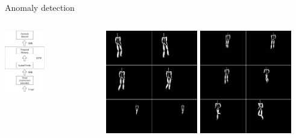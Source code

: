 \documentclass[default]{beamer}
\begin{document}
		\begin{frame}{Anomaly detection}
		\footnotesize
		
		\begin{columns}
			\begin{column}{0.5\textwidth}
				\centering
				\includegraphics[width=0.45\textwidth]{misc/mpf/schema.jpg}
			\end{column}
			\begin{column}{0.5\textwidth}
				\centering
				\includegraphics[width=0.45\textwidth]{misc/mpf/anom1.jpg}
				\vspace{10pt}
				\includegraphics[width=0.45\textwidth]{misc/mpf/anom2.jpg}

\end{column}
\end{columns}
\end{frame}
\end{document}
